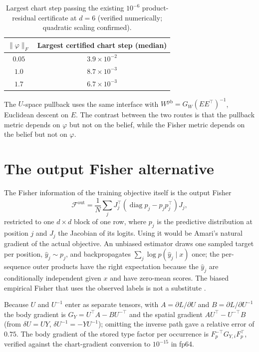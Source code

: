 \documentclass[11pt]{article}
\theoremstyle{definition}
\theoremstyle{remark}
\begin{document}
\begin{table}[ht]
\centering
\begin{tabular}{cc}
\toprule
$\|\varphi\|_F$ & Largest certified chart step (median)\\
\midrule
$0.05$ & $3.9\times10^{-2}$\\
$1.0$ & $8.7\times10^{-3}$\\
$1.7$ & $6.7\times10^{-3}$\\
\bottomrule
\end{tabular}
\caption{Largest chart step passing the existing $10^{-6}$ product-residual certificate at $d=6$ (verified numerically; quadratic scaling confirmed).}\label{tab:cap}
\end{table}

The $U$-space pullback uses the same interface with $W^{\mathrm{pb}}=G_W(EE^\top)^{-1}$, Euclidean descent on $E$. The contrast between the two routes is that the pullback metric depends on $\varphi$ but not on the belief, while the Fisher metric depends on the belief but not on $\varphi$.

\section{The output Fisher alternative}\label{sec:output}

The Fisher information of the training objective itself is the output Fisher
\begin{equation}\label{eq:output}
\mathcal{F}^{\mathrm{out}}=\frac1N\sum_jJ_j^\top\left(\operatorname{diag}p_j-p_jp_j^\top\right)J_j,
\end{equation}
restricted to one $d\times d$ block of one row, where $p_j$ is the predictive distribution at position $j$ and $J_j$ the Jacobian of its logits. Using it would be Amari's natural gradient of the actual objective. An unbiased estimator draws one sampled target per position, $\hat y_j\sim p_j$, and backpropagates $\sum_j\log p(\hat y_j\mid x)$ once; the per-sequence outer products have the right expectation because the $\hat y_j$ are conditionally independent given $x$ and have zero-mean scores. The biased empirical Fisher that uses the observed labels is not a substitute \cite{Kunstner2019}.

Because $U$ and $U^{-1}$ enter as separate tensors, with $A=\partial L/\partial U$ and $B=\partial L/\partial U^{-1}$ the body gradient is $G_Y=U^\top A-BU^{-\top}$ and the spatial gradient $AU^\top-U^{-\top}B$ (from $\delta U=UY$, $\delta U^{-1}=-YU^{-1}$); omitting the inverse path gave a relative error of $0.75$. The body gradient of the stored type factor per occurrence is $F_p^{-\top}G_{Y,i}F_p^\top$, verified against the chart-gradient conversion to $10^{-15}$ in fp64.
\end{document}
